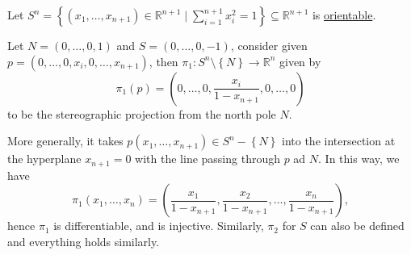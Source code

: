 \begin{eg}
	Let \(S^n = \left\{ (x_1, \ldots , x_{n+1})\in \mathbb{R} ^{n+1} \mid \sum_{i=1}^{n+1} x_i^2 = 1 \right\} \subseteq \mathbb{R} ^{n+1}\) is \hyperref[def:orientable]{orientable}.
\end{eg}
\begin{explanation}
	Let \(N=(0, \ldots , 0, 1)\) and \(S=(0, \ldots , 0, -1)\), consider given \(p=(0, \ldots , 0, x_i, 0, \ldots , x_{n+1} )\), then \(\pi _1\colon S^n \setminus \left\{ N \right\} \to \mathbb{R} ^n\) given by
	\[
		\pi _1(p) = \left( 0, \ldots , 0, \frac{x_i}{1-x_{n+1}}, 0, \ldots , 0 \right)
	\]
	to be the stereographic projection from the north pole \(N\).

	\begin{center}
	\end{center}

	More generally, it takes \(p(x_1, \ldots , x_{n+1})\in S^{n}-\left\{ N \right\}\) into the intersection at the hyperplane \(x_{n+1}= 0\) with the line passing through \(p\) ad \(N\). In this way, we have
	\[
		\pi _1(x_1, \ldots , x_n) = \left( \frac{x_1}{1-x_{n+1}}, \frac{x_2}{1-x_{n+1}}, \ldots , \frac{x_n}{1-x_{n+1}} \right),
	\]
	hence \(\pi _1\) is differentiable, and is injective. Similarly, \(\pi _2\) for \(S\) can also be defined and everything holds similarly.
\end{explanation}